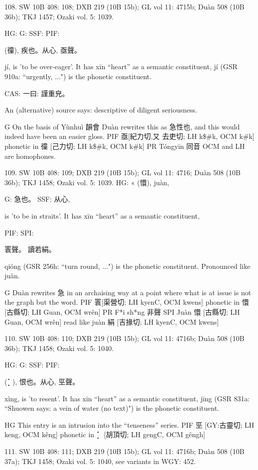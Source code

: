 108. SW 10B 408: 108; DXB 219 (10B 15b); GL vol 11: 4715b; Duàn 508 (10B 36b); TKJ 1457; Ozaki vol. 5: 1039.


HG:
G: SSF: PIF:

(徸),
疾也。从心, 亟聲。

jí,
is 'to be over-eager'.
It has xīn ``heart'' as a semantic constituent,
jí (GSR 910a: ``urgently, ...") is the phonetic constituent.

CAS: 一曰:
謹重皃。

An (alternative) source says: descriptive of diligent seriousness.

G	On the basis of Yùnhuì 韻會 Duàn rewrites this as 急性也, and this would indeed have been an easier gloss.
PIF     亟[紀力切,又 去吏切; LH k\$\#k, OCM k\#k] phonetic in 徸 [己力切; LH k\$\#k, OCM k\#k]
PR	Tóngyīn 同音 OCM and LH are homophones.



109. SW 10B 408: 109; DXB 219 (10B 15b); GL vol 11: 4716; Duàn 508 (10B 36b); TKJ 1458; Ozaki vol. 5: 1039.
HG:  « (懁), juàn,

G:	急也。
SSF: 从心,

is 'to be in straits'.
It has xīn ``heart'' as a semantic constituent,

PIF: SPI:

瞏聲。 讀若絹。

qióng (GSR 256h: ``turn round, ...") is the phonetic constituent. Pronounced like juàn.

G	Duàn rewrites 急 in an archaising way at a point where what is at issue is not the graph but the word.
PIF     瞏[渠營切; LH kyenC, OCM kwens] phonetic in 懁 [古縣切; LH Guan, OCM wrên]
PR	F*i sh*ng 非聲
SPI     Juàn 懁 [古縣切; LH Guan, OCM wrên] read like juàn 絹 [吉掾切; LH kyenC, OCM kwens]

110. SW 10B 408: 110; DXB 219 (10B 15b); GL vol 11: 4716b; Duàn 508 (10B 36b); TKJ 1458; Ozaki vol. 5: 1040.


HG:
G: SSF: PIF:

(⡁),
恨也。从心, 巠聲。

xìng,
is 'to resent'.
It has xīn ``heart'' as a semantic constituent,
jīng (GSR 831a: ``Shuowen says: a vein of water (no text)") is the phonetic constituent.

HG This entry is an intrusion into the ``tenseness'' series.
PIF     巠 [GY:古靈切; LH keng, OCM kêng] phonetic in ⡁ [胡頂切; LH gengC, OCM gêngh]

111. SW 10B 408: 111; DXB 219 (10B 15b); GL vol 11: 4716b; Duàn 508 (10B 37a); TKJ 1458; Ozaki vol. 5: 1040, see
variants in WGY: 452.


